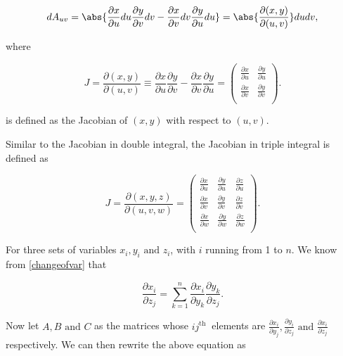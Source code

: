 \documentclass[english,a4paper,12pt]{report}
\begin{document}
\begin{equation}
	dA_{uv} = \abs{\frac{\partial x}{\partial u} du \frac{\partial y}{\partial v} dv - \frac{\partial x}{\partial v} dv \frac{\partial y}{\partial u} du} = \abs{\frac{\partial (x,y)}{\partial (u,v)} } dudv,
\end{equation}

where 

\begin{equation}
	J = \frac{\partial (x,y)}{\partial (u,v)} \equiv \frac{\partial x}{\partial u} \frac{\partial y}{\partial v} - \frac{\partial x}{\partial v} \frac{\partial y}{\partial u} = \begin{pmatrix}
		\frac{\partial x}{\partial u}  & \frac{\partial y}{\partial u}   \\
		\frac{\partial x}{\partial v}  & \frac{\partial y}{\partial v}   \\
	\end{pmatrix}.
\end{equation}

is defined as the Jacobian of \((x,y)\) with respect to \((u,v)\).


Similar to the Jacobian in double integral, the Jacobian in triple integral is defined as 

\begin{equation}
	J = \frac{\partial (x,y,z)}{\partial (u,v,w)} = \begin{pmatrix}
		\frac{\partial x}{\partial u}  & \frac{\partial y}{\partial u}  & \frac{\partial z}{\partial u}   \\
		\frac{\partial x}{\partial v}  & \frac{\partial y}{\partial v}  & \frac{\partial z}{\partial v}   \\
		\frac{\partial x}{\partial w}  & \frac{\partial y}{\partial w}  & \frac{\partial z}{\partial w}   \\
	\end{pmatrix}.
\end{equation}

For three sets of variables \(x_{i}, y_{i} \text { and } z_{i}\), with \(i\) running from 1 to \(n\). We know from \cref{changeofvar} that

\begin{equation}
	\frac{\partial x_{i} }{\partial z_{j} } = \sum_{k=1}^{n} \frac{\partial x_{i} }{\partial y_{k} } \frac{\partial y_{k} }{\partial z_{j} }.   
\end{equation}

Now let \(A, B \text { and } C\) as the matrices whose \(ij^{\text{th }} \) elements are \(\displaystyle \frac{\partial x_{i} }{\partial y_{j} }, \frac{\partial y_{i} }{\partial z_{j} } \text { and } \frac{\partial x_{i} }{\partial z_{j} }\) respectively. We can then rewrite the above equation as 
\end{document}
